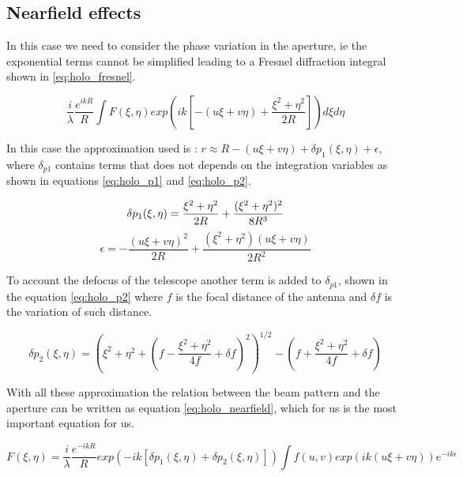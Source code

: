 \subsection{Nearfield effects}
In this case we need to consider the phase variation in the aperture, ie the exponential terms cannot be simplified leading to a Fresnel diffraction integral shown in \ref{eq:holo_fresnel}.


\begin{equation}
    \frac{i}{\lambda}\frac{e^{ikR}}{R} \int F(\xi,\eta) exp\left(ik\left[-(u\xi+v\eta)+\frac{\xi^2+\eta^2}{2R}\right]\right)d\xi d\eta
    \label{eq:holo_fresnel}
\end{equation}


 In this case the approximation used is : $r \approx R-(u\xi+v\eta)+\delta p_1(\xi,\eta)+\epsilon$, where $\delta_{p1}$ contains terms that does not depends on the integration variables as shown in equations \ref{eq:holo_p1} and \ref{eq:holo_p2}.

\begin{equation}
    \delta p_1(\xi,\eta) = \frac{\xi^2+\eta^2}{2R}+\frac{(\xi^2+\eta^2)^2}{8R^3} \\
    \label{eq:holo_p1}
\end{equation}
\begin{equation}
    \epsilon = -\frac{(u\xi+v\eta)^2}{2R}+\frac{(\xi^2+\eta^2)(u\xi+v\eta)}{2R^2}
    \label{eq:holo_epsilon}
\end{equation}



To account the defocus of the telescope another term is added to $\delta_{p1}$, shown in the equation \ref{eq:holo_p2} where $f$ is the focal distance of the antenna and $\delta f$  is the variation of such distance.

\begin{equation}
    \delta p_2(\xi, \eta) = (\xi^2+\eta^2+(f-\frac{\xi^2+\eta^2}{4f}+\delta f)^2)^{1/2} - (f+\frac{\xi^2+\eta^2}{4f}+\delta f)
    \label{eq:holo_p2}
\end{equation}



With all these approximation the relation between the beam pattern and the aperture can be written as equation \ref{eq:holo_nearfield}, which for us is the most important equation for us.


\begin{equation}
    \boxed{ F(\xi, \eta) = \frac{i}{\lambda}\frac{e^{-ikR}}{R} exp\left(-ik[\delta p_1(\xi,\eta)+\delta p_2(\xi, \eta)]\right) \int f(u,v)exp\left(ik(u\xi+v\eta)\right)e^{-ik\epsilon} }
    \label{eq:holo_nearfield}
\end{equation}


